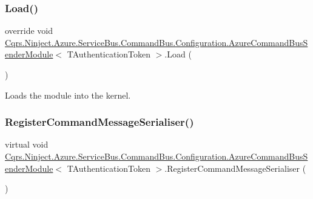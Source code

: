 \subsubsection{\texorpdfstring{Load()}{Load()}}
{\footnotesize\ttfamily override void \hyperlink{classCqrs_1_1Ninject_1_1Azure_1_1ServiceBus_1_1CommandBus_1_1Configuration_1_1AzureCommandBusSenderModule}{Cqrs.\+Ninject.\+Azure.\+Service\+Bus.\+Command\+Bus.\+Configuration.\+Azure\+Command\+Bus\+Sender\+Module}$<$ T\+Authentication\+Token $>$.Load (\begin{DoxyParamCaption}{ }\end{DoxyParamCaption})}



Loads the module into the kernel. 

\mbox{\label{classCqrs_1_1Ninject_1_1Azure_1_1ServiceBus_1_1CommandBus_1_1Configuration_1_1AzureCommandBusSenderModule_a9a40a7924b1adaa02b95e5d244ff5e82}} 
\subsubsection{\texorpdfstring{Register\+Command\+Message\+Serialiser()}{RegisterCommandMessageSerialiser()}}
{\footnotesize\ttfamily virtual void \hyperlink{classCqrs_1_1Ninject_1_1Azure_1_1ServiceBus_1_1CommandBus_1_1Configuration_1_1AzureCommandBusSenderModule}{Cqrs.\+Ninject.\+Azure.\+Service\+Bus.\+Command\+Bus.\+Configuration.\+Azure\+Command\+Bus\+Sender\+Module}$<$ T\+Authentication\+Token $>$.Register\+Command\+Message\+Serialiser (\begin{DoxyParamCaption}{ }\end{DoxyParamCaption})\hspace{0.3cm}{\ttfamily [virtual]}}



